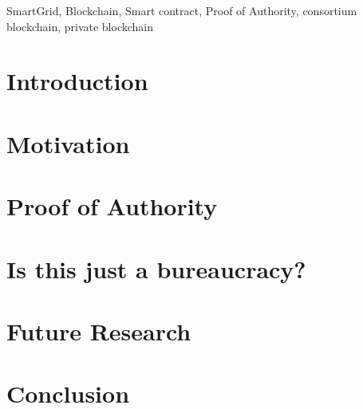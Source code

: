 \documentclass[conference]{IEEEtran}
\begin{document}
\begin{IEEEkeywords}
SmartGrid, Blockchain, Smart contract, Proof of Authority, consortium blockchain, private blockchain 
    \end{IEEEkeywords}





\section{Introduction}
\label{introduction}

\section{Motivation}
\label{motivation}

\section{Proof of Authority}
\label{proof_of_authority}

\section{Is this just a bureaucracy?}
\label{bureacracy}

\section{Future Research}
\label{future_research}

\section{Conclusion}
\label{conclusion}

  


 
\end{document}
